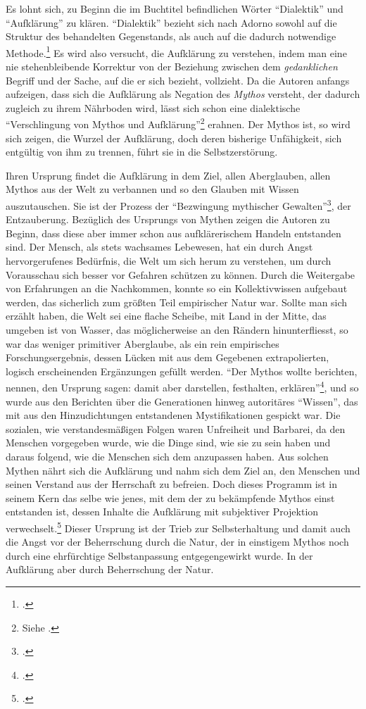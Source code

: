 \documentclass[a4paper, 12pt]{article}
\begin{document}
\begin{onehalfspace}
Es lohnt sich, zu Beginn die im Buchtitel befindlichen Wörter "`Dialektik"' und "`Aufklärung"' zu klären. "`Dialektik"' bezieht sich nach Adorno sowohl auf die Struktur des behandelten Gegenstands, als auch auf die dadurch notwendige Methode.\footnote{\Cite[Vgl.][S. 9]{dialektik}.} Es wird also versucht, die Aufklärung zu verstehen, indem man eine nie stehenbleibende Korrektur von der Beziehung zwischen dem \emph{gedanklichen} Begriff und der Sache, auf die er sich bezieht, vollzieht. Da die Autoren anfangs aufzeigen, dass sich die Aufklärung als Negation des \emph{Mythos} versteht, der dadurch zugleich zu ihrem Nährboden wird, lässt sich schon eine dialektische "`Verschlingung von Mythos und Aufklärung"'\footnote{Siehe \Cite{habermas}.} erahnen. Der Mythos ist, so wird sich zeigen, die Wurzel der Aufklärung, doch deren bisherige Unfähigkeit, sich entgültig von ihm zu trennen, führt sie in die Selbstzerstörung.

Ihren Ursprung findet die Aufklärung in dem Ziel, allen Aberglauben, allen Mythos aus der Welt zu verbannen und so den Glauben mit Wissen auszutauschen. Sie ist der Prozess der "`Bezwingung mythischer Gewalten"'\footnote{\Cite[Siehe][S. 408]{habermas}.}, der Entzauberung. Bezüglich des Ursprungs von Mythen zeigen die Autoren zu Beginn, dass diese aber immer schon aus aufklärerischem Handeln entstanden sind. Der Mensch, als stets wachsames Lebewesen, hat ein durch Angst hervorgerufenes Bedürfnis, die Welt um sich herum zu verstehen, um durch Vorausschau sich besser vor Gefahren schützen zu können. Durch die Weitergabe von Erfahrungen an die Nachkommen, konnte so ein Kollektivwissen aufgebaut werden, das sicherlich zum größten Teil empirischer Natur war. Sollte man sich erzählt haben, die Welt sei eine flache Scheibe, mit Land in der Mitte, das umgeben ist von Wasser, das möglicherweise an den Rändern hinunterfliesst, so war das weniger primitiver Aberglaube, als ein rein empirisches Forschungsergebnis, dessen Lücken mit aus dem Gegebenen extrapolierten, logisch erscheinenden Ergänzungen gefüllt werden. "`Der Mythos wollte berichten, nennen, den Ursprung sagen: damit aber darstellen, festhalten, erklären"'\footnote{\Cite[Siehe][S. 14]{dialektik-der-aufklaerung}.}, und so wurde aus den Berichten über die Generationen hinweg autoritäres "`Wissen"', das mit aus den Hinzudichtungen entstandenen Mystifikationen gespickt war. Die sozialen, wie verstandesmäßigen Folgen waren Unfreiheit und Barbarei, da den Menschen vorgegeben wurde, wie die Dinge sind, wie sie zu sein haben und daraus folgend, wie die Menschen sich dem anzupassen haben. Aus solchen Mythen nährt sich die Aufklärung und nahm sich dem Ziel an, den Menschen und seinen Verstand aus der Herrschaft zu befreien. Doch dieses Programm ist in seinem Kern das selbe wie jenes, mit dem der zu bekämpfende Mythos einst entstanden ist, dessen Inhalte die Aufklärung mit subjektiver Projektion verwechselt.\footnote{\Cite[Vgl.][S. 12]{dialektik-der-aufklaerung}.} Dieser Ursprung ist der Trieb zur Selbsterhaltung und damit auch die Angst vor der Beherrschung durch die Natur, der in einstigem Mythos noch durch eine ehrfürchtige Selbstanpassung entgegengewirkt wurde. In der Aufklärung aber durch Beherrschung der Natur. 


\end{onehalfspace}
\end{document}
